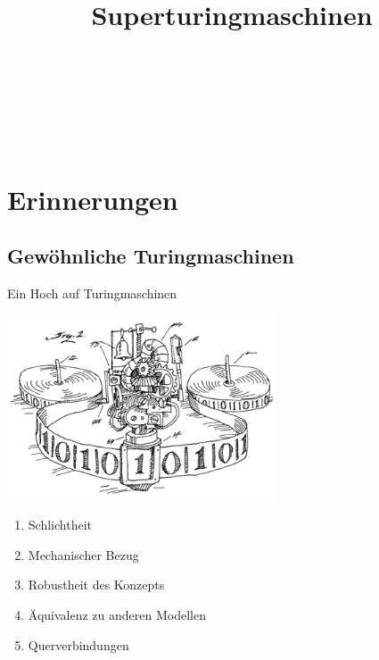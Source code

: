 \documentclass[12pt,compress,ngerman,utf8,t]{beamer}
\title[Superturingmaschinen]{Superturingmaschinen}
\author[Ingo Blechschmidt]{\textcolor{white}{Ingo Blechschmidt}}
\date[2016-10-04]{\vspace*{-4em}\ \\\textcolor{white}{\scriptsize Curry Club Augsburg \\ 4. Oktober 2016 und 3. November 2016}}
\renewcommand{\_}{\mathpunct{.}\,}
\begin{document}
{
\frame{\vspace*{12em}\titlepage}}
\frame{\tableofcontents}

\section{Erinnerungen}

\subsection{Gewöhnliche Turingmaschinen}

\begin{frame}{Ein Hoch auf Turingmaschinen}
  \begin{center}
    \includegraphics[width=0.6\textwidth]{images/turing-machine}
  \end{center}

  \begin{multicols}{2}
    \begin{enumerate}
      \item Schlichtheit
      \item Mechanischer Bezug
      \item Robustheit des Konzepts
      \item Äquivalenz zu anderen Modellen
      \item Querverbindungen
    \end{enumerate}
  \end{multicols}
\end{frame}
\end{document}

